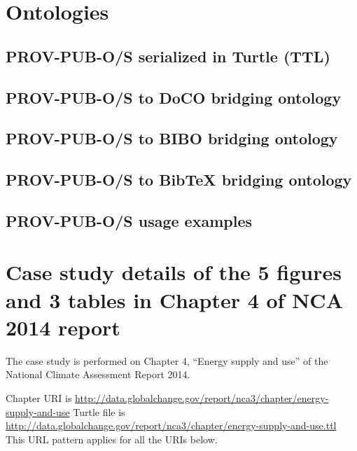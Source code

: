 
\appendix    %

\chapter{Ontologies}
\section{PROV-PUB-O/S serialized in Turtle (TTL)}

\section{PROV-PUB-O/S to DoCO bridging ontology}

\section{PROV-PUB-O/S to BIBO bridging ontology}

\section{PROV-PUB-O/S to BibTeX bridging ontology}

\section{PROV-PUB-O/S usage examples}


\chapter{Case study details of the 5 figures and 3 tables in Chapter 4 of NCA 2014 report}
The case study is performed on Chapter 4, ``Energy supply and use'' of the National Climate Assessment Report 2014.

Chapter URI is \url{http://data.globalchange.gov/report/nca3/chapter/energy-supply-and-use}
Turtle file is \url{http://data.globalchange.gov/report/nca3/chapter/energy-supply-and-use.ttl}
This URL pattern applies for all the URIs below.


